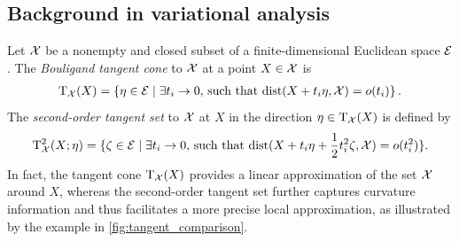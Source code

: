 \subsection{Background in variational analysis}\label{sec:background_vari}
Let $\mathcal{X}$ be a nonempty and closed subset of a finite-dimensional Euclidean space $\mathcal{E}$. The \emph{Bouligand tangent cone} to $\mathcal{X}$ at a point $X\in\mathcal{X}$ is
\begin{equation}\label{eq:tangentcone}
    \begin{aligned}
        \mathrm{T}_{\mathcal{X}}(X) = \left\{ \eta\in\mathcal{E}\mid \exists t_i\to0,\,\text{such that}\,\operatorname{dist}(X+t_i\eta,\mathcal{X})=o(t_i)\right\}.
    \end{aligned}
\end{equation}
The \emph{second-order tangent set} to $\mathcal{X}$ at $X$ in the direction $\eta\in\mathrm{T}_{\mathcal{X}}(X)$ is defined by
\begin{equation}\label{eq:second_tangentcone}
    \begin{aligned}
        \mathrm{T}^2_{\mathcal{X}}(X;\eta) = \{ \zeta\in\mathcal{E}\mid \exists t_i\to0,\,\text{such that}\, \operatorname{dist}(X+t_i\eta+\frac{1}{2}t_i^2\zeta,\mathcal{X})=o(t_i^2)\}.      
    \end{aligned}
\end{equation}
In fact, the tangent cone $\mathrm{T}_{\mathcal{X}}(X)$ provides a linear approximation of the set $\mathcal{X}$ around $X$, whereas the second-order tangent set further captures curvature information and thus facilitates a more precise local approximation, as illustrated by the example in \myfig\ref{fig:tangent_comparison}.
